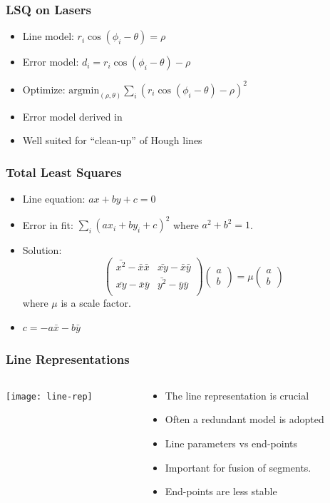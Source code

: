 \documentclass[10pt]{beamer}
\begin{document}
\begin{frame}
  \frametitle{LSQ on Lasers}
  \begin{itemize}
  \item Line model: $r_i \cos(\phi_i - \theta) = \rho$
  \item Error model: $d_i = r_i \cos(\phi_i - \theta) - \rho$
  \item Optimize: $ \textrm{argmin}_{(\rho,\theta)} \sum_i (r_i
    \cos(\phi_i - \theta) - \rho)^2 $
  \item Error model derived in \citet{Deriche92a}
  \item Well suited for ``clean-up'' of Hough lines
  \end{itemize}
\end{frame}

\begin{frame}
  \frametitle{Total Least Squares}
  \begin{itemize}
  \item Line equation: $ a x + b y + c = 0 $
  \item Error in fit: $ \sum_i (a x_i + b y_i + c)^2 $ where $a^2
    + b^2 = 1$. 
  \item Solution: \[
    \left( \begin{array}{cc}
        \bar{x^2} - \bar{x}\bar{x} & \bar{xy} - \bar{x}\bar{y} \\
        \bar{xy} - \bar{x}\bar{y}  & \bar{y^2} - \bar{y}\bar{y}\\
      \end{array} \right) 
    \left( \begin{array}{c}
        a \\ b \end{array} \right) = \mu 
    \left( \begin{array}{c}
        a \\ b \end{array} \right) \] where $\mu$ is a scale
    factor.
  \item $c = -a \bar{x} - b \bar{y}$
  \end{itemize}
\end{frame}

\begin{frame}
  \frametitle{Line Representations}
  \begin{columns}
    \begin{column}{5.5cm}
      \texttt{[image: line-rep]}
    \end{column}
    \begin{column}{6cm}
      \begin{itemize}\setlength{\itemsep}{0pt}
      \item The line representation is crucial
      \item Often a redundant model is adopted
      \item Line parameters vs end-points
      \item Important for fusion of segments.
      \item End-points are less stable 
      \end{itemize}
    \end{column}
  \end{columns}
\end{frame}
\end{document}
